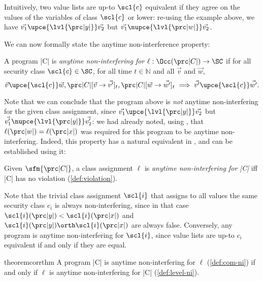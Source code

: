 Intuitively, two value lists are up-to \(\scl{c}\) equivalent if they agree on the values of the variables of class \(\scl{c}\) or lower: re-using the example above, we have \(\vec{v_1} \upce{\lvl{\prc|y|}} \vec{v_2}\) but  \(\vec{v_1} \nupce{\lvl{\prc|w|}} \vec{v_2}\).

We can now formally state the anytime non-interference property:

\begin{definition}%
\label{def:com-ni}
A program \prc|C| is \emph{anytime non-interfering for \(\ell : \Occ(\prc|C|) \to \SC\)} if for all security class \(\scl{c} \in \SC\), for all time \(t \in \mathbb{N}\) and all %
\(\vec{v}\) and \(\vec{w}\),
\[
\vec{v}\upce{\scl{c}} \vec{w}, \prc|C|[\vec{v} \rightarrow \vec{v'}]_t, \prc|C|[\vec{w} \rightarrow \vec{w'}]_t \implies \vec{v'}\upce{\scl{c}} \vec{w'}\text{.}
\]
\end{definition}

Note that we can conclude that the program above is \emph{not} anytime non-interfering for the given class assignment, since \(\vec{v_1} \upce{\lvl{\prc|y|}} \vec{v_2}\) but \(\vec{v_1'} \nupce{\lvl{\prc|y|}} \vec{v_2'}\): we had already noted, using \lname, that \(\ell(\prc|w|) = \ell(\prc|x|)\) was required for this program to be anytime non-interfering.
Indeed, this property has a natural equivalent in \lname, and can be established using it:

\begin{definition}%
\label{def:level-ni}
Given $\sfm{\prc|C|}$, a class assignment \(\ell\) is \emph{anytime non-interfering for \prc|C|} iff \prc|C| has no violation (\autoref{def:violation}).
\end{definition}

Note that the trivial class assignment \(\scl{i}\) that assigns to all values the same security class \(c_i\) is always non-interfering, since in that case \(\scl{i}(\prc|y|) < \scl{i}(\prc|x|)\) and \(\scl{i}(\prc|y|) \orth \scl{i}(\prc|x|)\) are always false.
Conversely, any program is anytime non-interfering for \(\scl{i}\), since value lists are up-to \(c_i\) equivalent if and only if they are equal.

\begin{restatable}[Correspondance]{theorem}{corrthm}\label{thm:corr}
A program \prc|C| is anytime non-interfering for \(\ell\) (\autoref{def:com-ni}) if and only if \(\ell\) is anytime non-interfering for \prc|C| (\autoref{def:level-ni}).
\end{restatable}

